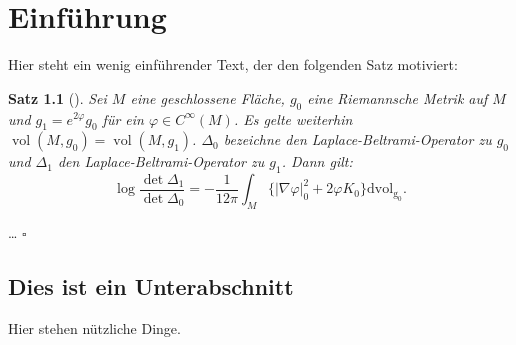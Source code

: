 \documentclass[paper=a4, 
               fontsize=11pt, 
               DIV=13, 
               BCOR=14.0mm, 
               titlepage=true,
               ngerman]
               {scrbook}
\newtheorem{thm}{Satz}[chapter]
\numberwithin{equation}{chapter}
\numberwithin{Definition}{chapter}
\numberwithin{definition}{chapter}
\numberwithin{Korollar}{chapter}
\numberwithin{korollar}{chapter}
\numberwithin{Lemma}{chapter}
\numberwithin{lemma}{chapter}
\numberwithin{Proposition}{chapter}
\numberwithin{proposition}{chapter}
\numberwithin{Beispiel}{chapter}
\numberwithin{Bemerkung}{chapter}
\newcommand{\polyakov}{ \log \frac{\det \Delta_1}{\det \Delta_0} = -\frac{1}{12 \pi} \int_M \{ |\nabla \varphi|_0^2 + 2 \varphi K_0\} \mathrm{dvol_{g_0}}}
\begin{document}
\chapter{Einführung}
Hier steht ein wenig einführender Text, der den folgenden Satz motiviert:
\begin{thm}[\cite{Polyakov1981}]
Sei $M$ eine geschlossene Fläche, $g_0$ eine Riemannsche Metrik auf $M$ und $g_1 = e^{2\varphi}g_0$ für ein $\varphi \in C^{\infty}(M)$. Es gelte
weiterhin $\operatorname{vol}(M,g_0) = \operatorname{vol}(M,g_1)$. $\Delta_0$ bezeichne den Laplace-Beltrami-Operator
zu $g_0$ und $\Delta_1$ den Laplace-Beltrami-Operator zu $g_1$. Dann gilt:
\begin{equation}
\label{eq:polyakov}
\polyakov.
\end{equation}
\end{thm}
\begin{Beweis}
\dots
\flushright$\square$ 
\end{Beweis}

\section{Dies ist ein Unterabschnitt}
Hier stehen nützliche Dinge.
\nocite{*} %


\end{document}

